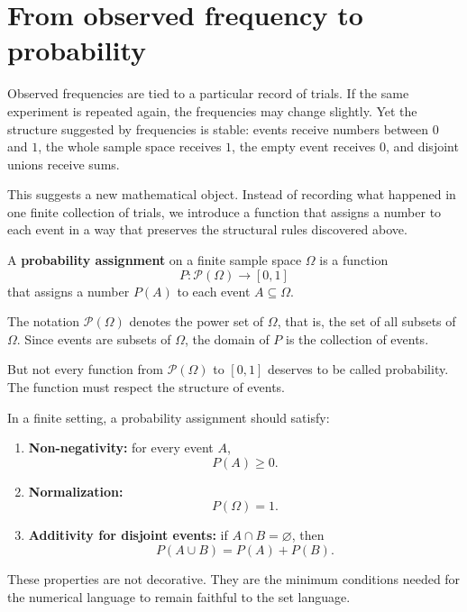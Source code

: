 \section{From observed frequency to probability}

Observed frequencies are tied to a particular record of trials. If the same experiment is repeated again, the frequencies may change slightly. Yet the structure suggested by frequencies is stable: events receive numbers between \(0\) and \(1\), the whole sample space receives \(1\), the empty event receives \(0\), and disjoint unions receive sums.

This suggests a new mathematical object. Instead of recording what happened in one finite collection of trials, we introduce a function that assigns a number to each event in a way that preserves the structural rules discovered above.

\begin{definitionbox}
A \textbf{probability assignment} on a finite sample space \(\Omega\) is a function
\[
P:\mathcal{P}(\Omega)\to[0,1]
\]
that assigns a number \(P(A)\) to each event \(A\subseteq\Omega\).
\end{definitionbox}

The notation \(\mathcal{P}(\Omega)\) denotes the power set of \(\Omega\), that is, the set of all subsets of \(\Omega\). Since events are subsets of \(\Omega\), the domain of \(P\) is the collection of events.

But not every function from \(\mathcal{P}(\Omega)\) to \([0,1]\) deserves to be called probability. The function must respect the structure of events.

\begin{theorembox}
In a finite setting, a probability assignment should satisfy:
\begin{enumerate}
    \item \textbf{Non-negativity:} for every event \(A\),
    \[
    P(A)\geq 0.
    \]
    \item \textbf{Normalization:}
    \[
    P(\Omega)=1.
    \]
    \item \textbf{Additivity for disjoint events:} if \(A\cap B=\varnothing\), then
    \[
    P(A\cup B)=P(A)+P(B).
    \]
\end{enumerate}
\end{theorembox}

These properties are not decorative. They are the minimum conditions needed for the numerical language to remain faithful to the set language.

